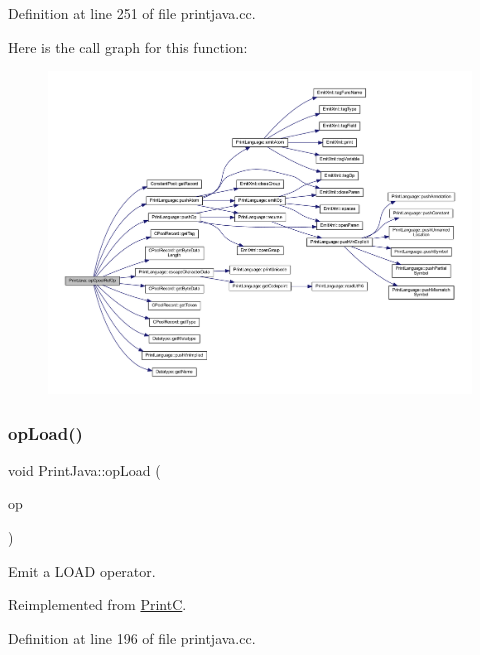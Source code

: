 Definition at line 251 of file printjava.\+cc.

Here is the call graph for this function\+:
\nopagebreak
\begin{figure}[H]
\begin{center}
\leavevmode
\includegraphics[width=350pt]{class_print_java_a8e3d5480ebf8a4b59aa5729380544f15_cgraph}
\end{center}
\end{figure}
\mbox{\label{class_print_java_afd7d6ab9dfeae02ed5a32eb0e0b9aec3}} 
\subsubsection{\texorpdfstring{opLoad()}{opLoad()}}
{\footnotesize\ttfamily void Print\+Java\+::op\+Load (\begin{DoxyParamCaption}\item[{const \mbox{\hyperlink{class_pcode_op}{Pcode\+Op}} $\ast$}]{op }\end{DoxyParamCaption})\hspace{0.3cm}{\ttfamily [virtual]}}



Emit a L\+O\+AD operator. 



Reimplemented from \mbox{\hyperlink{class_print_c_a263dc1f6686e7792bcdd29006aaaac4a}{PrintC}}.



Definition at line 196 of file printjava.\+cc.

